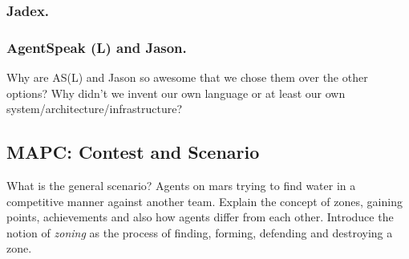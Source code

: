 \subsubsection{Jadex.}
\subsubsection{AgentSpeak (L) and Jason.}
Why are AS(L) and Jason so awesome that we chose them over the other options? Why didn't we invent our own language or at least our own system/architecture/infrastructure?
\subsection{MAPC: Contest and Scenario}
What is the general scenario? Agents on mars trying to find water in a competitive manner against another team. Explain the concept of zones, gaining points, achievements and also how agents differ from each other. Introduce the notion of \emph{zoning} as the process of finding, forming, defending and destroying a zone.
